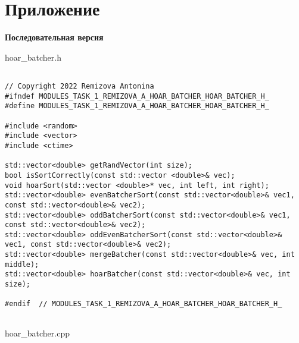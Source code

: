 \documentclass{report}
\begin{document}
\section*{Приложение}
\textbf{Последовательная версия}
\par hoar\_batcher.h
\begin{lstlisting}

// Copyright 2022 Remizova Antonina
#ifndef MODULES_TASK_1_REMIZOVA_A_HOAR_BATCHER_HOAR_BATCHER_H_
#define MODULES_TASK_1_REMIZOVA_A_HOAR_BATCHER_HOAR_BATCHER_H_

#include <random>
#include <vector>
#include <ctime>

std::vector<double> getRandVector(int size);
bool isSortCorrectly(const std::vector <double>& vec);
void hoarSort(std::vector <double>* vec, int left, int right);
std::vector<double> evenBatcherSort(const std::vector<double>& vec1, const std::vector<double>& vec2);
std::vector<double> oddBatcherSort(const std::vector<double>& vec1, const std::vector<double>& vec2);
std::vector<double> oddEvenBatcherSort(const std::vector<double>& vec1, const std::vector<double>& vec2);
std::vector<double> mergeBatcher(const std::vector<double>& vec, int middle);
std::vector<double> hoarBatcher(const std::vector<double>& vec, int size);

#endif  // MODULES_TASK_1_REMIZOVA_A_HOAR_BATCHER_HOAR_BATCHER_H_


\end{lstlisting}
\par hoar\_batcher.cpp
\end{document}
